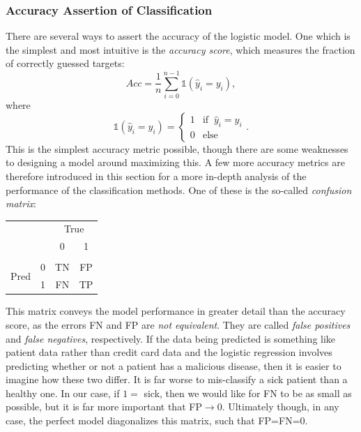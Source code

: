         \subsubsection{Accuracy Assertion of Classification}
            There are several ways to assert the accuracy of the logistic model. One which is the simplest and most intuitive is the \textit{accuracy score}, which measures the fraction of correctly guessed targets:
            \begin{equation}
                Acc = \frac1n\sum^{n-1}_{i=0} \mathds{1}(\hat{y}_i=y_i),
            \end{equation}
            where 
            \begin{equation}
                \mathds{1}(\hat{y}_i=y_i) = \begin{cases}1 & \text{if  }\ \hat{y}_i=y_i \\ 0 & \text{else}\end{cases}.
            \end{equation}
            This is the simplest accuracy metric possible, though there are some weaknesses to designing a model around maximizing this. A few more accuracy metrics are therefore introduced in this section for a more in-depth analysis of the performance of the classification methods. One of these is the so-called \textit{confusion matrix}:
            \begin{table}[H]
                \centering
                \begin{tabular}{cc|@{\hskip 0.1in}cc}
                     & & \multicolumn{2}{c}{True}\\
                     & & 0 & 1\\\hline & & & \\
                    \multirow{ 2}{*}{Pred} & 0 & TN & FP \\
                     & 1 & FN & TP
                \end{tabular}
            \end{table}
            This matrix conveys the model performance in greater detail than the accuracy score, as the errors FN and FP are \textit{not equivalent}. They are called \textit{false positives} and \textit{false negatives}, respectively. If the data being predicted is something like patient data rather than credit card data and the logistic regression involves predicting whether or not a patient has a malicious disease, then it is easier to imagine how these two differ. It is far worse to mis-classify a sick patient than a healthy one. In our case, if $1=$ sick, then we would like for FN to be as small as possible, but it is far more important that FP$\rightarrow 0$. Ultimately though, in any case, the perfect model diagonalizes this matrix, such that FP=FN=0. \\\\
